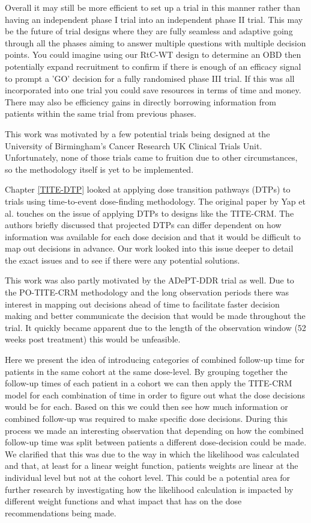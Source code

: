 Overall it may still be more efficient to set up a trial in this manner rather than having an independent phase \RN{1} trial into an independent phase \RN{2} trial. This may be the future of trial designs where they are fully seamless and adaptive going through all the phases aiming to answer multiple questions with multiple decision points. You could imagine using our RtC-WT design to determine an OBD then potentially expand recruitment to confirm if there is enough of an efficacy signal to prompt a 'GO' decision for a fully randomised phase \RN{3} trial. If this was all incorporated into one trial you could save resources in terms of time and money. There may also be efficiency gains in directly borrowing information from patients within the same trial from previous phases. 

This work was motivated by a few potential trials being designed at the University of Birmingham's Cancer Research UK Clinical Trials Unit. Unfortunately, none of those trials came to fruition due to other circumstances, so the methodology itself is yet to be implemented.  

Chapter \ref{TITE-DTP} looked at applying dose transition pathways (DTPs) to trials using time-to-event dose-finding methodology. The original paper by Yap et al. \cite{yapDoseTransitionPathways2017} touches on the issue of applying DTPs to designs like the TITE-CRM. The authors briefly discussed that projected DTPs can differ dependent on how information was available for each dose decision and that it would be difficult to map out decisions in advance. Our work looked into this issue deeper to detail the exact issues and to see if there were any potential solutions.

This work was also partly motivated by the ADePT-DDR trial as well. Due to the PO-TITE-CRM methodology and the long observation periods there was interest in mapping out decisions ahead of time to facilitate faster decision making and better communicate the decision that would be made throughout the trial. It quickly became apparent due to the length of the observation window (52 weeks post treatment) this would be unfeasible. 

Here we present the idea of introducing categories of combined follow-up time for patients in the same cohort at the same dose-level. By grouping together the follow-up times of each patient in a cohort we can then apply the TITE-CRM model for each combination of time in order to figure out what the dose decisions would be for each. Based on this we could then see how much information or combined follow-up was required to make specific dose decisions. During this process we made an interesting observation that depending on how the combined follow-up time was split between patients a different dose-decision could be made. We clarified that this was due to the way in which the likelihood was calculated and that, at least for a linear weight function, patients weights are linear at the individual level but not at the cohort level. This could be a potential area for further research by investigating how the likelihood calculation is impacted by different weight functions and what impact that has on the dose recommendations being made. 


